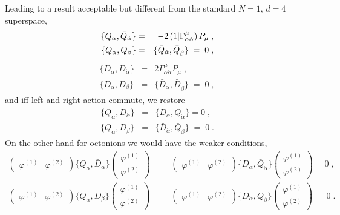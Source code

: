 \documentclass[a4paper,12pt]{book}
\begin{document}
Leading to a result acceptable but different from the standard $N=1$, $d=4$
superspace, 
\begin{eqnarray}
\{Q_{\alpha },\bar{Q}_{\dot{\alpha}}\} &=&-2\left( 1|\Gamma _{\alpha {\dot{%
\alpha}}}^{\mu }\right) P_{\mu }\;,  \nonumber \\
\{Q_{\alpha },Q_{\beta }\} &=&\{\bar{Q}_{\dot{\alpha}},\bar{Q}_{\dot{\beta}%
}\}\;=\;0\;,  \nonumber
\end{eqnarray}
\begin{eqnarray}
\{D_{\alpha },\bar{D}_{\dot{\alpha}}\} &=&2\Gamma _{\alpha {\dot{\alpha}}%
}^{\mu }P_{\mu }\;,  \nonumber \\
\{D_{\alpha },D_{\beta }\} &=&\{\bar{D}_{\dot{\alpha}},\bar{D}_{\dot{\beta}%
}\}\;=\;0\;,  \nonumber
\end{eqnarray}
and iff left and right action commute, we restore 
\begin{eqnarray}
\{Q_{\alpha },\bar{D}_{\dot{\alpha}}\} &=&\{D_{\alpha },\bar{Q}_{\dot{\alpha}%
}\}=0\;,  \nonumber \\
\{Q_{\alpha },D_{\beta }\} &=&\{\bar{D}_{\dot{\alpha}},\bar{Q}_{\dot{\beta}%
}\}\;=\;0\;.  \nonumber
\end{eqnarray}
On the other hand for octonions we would have the weaker conditions, 
\begin{eqnarray}
\left( 
\begin{array}{ll}
\varphi ^{\left( 1\right) } & \varphi ^{\left( 2\right) }
\end{array}
\right) \{Q_{\alpha },\bar{D}_{\dot{\alpha}}\}\left( 
\begin{array}{l}
\varphi ^{\left( 1\right) } \\ 
\varphi ^{\left( 2\right) }
\end{array}
\right)  &=&\left( 
\begin{array}{ll}
\varphi ^{\left( 1\right) } & \varphi ^{\left( 2\right) }
\end{array}
\right) \{D_{\alpha },\bar{Q}_{\dot{\alpha}}\}\left( 
\begin{array}{l}
\varphi ^{\left( 1\right) } \\ 
\varphi ^{\left( 2\right) }
\end{array}
\right) =0\;,  \nonumber \\
\left( 
\begin{array}{ll}
\varphi ^{\left( 1\right) } & \varphi ^{\left( 2\right) }
\end{array}
\right) \{Q_{\alpha },D_{\beta }\}\left( 
\begin{array}{l}
\varphi ^{\left( 1\right) } \\ 
\varphi ^{\left( 2\right) }
\end{array}
\right)  &=&\left( 
\begin{array}{ll}
\varphi ^{\left( 1\right) } & \varphi ^{\left( 2\right) }
\end{array}
\right) \{\bar{D}_{\dot{\alpha}},\bar{Q}_{\dot{\beta}}\}\left( 
\begin{array}{l}
\varphi ^{\left( 1\right) } \\ 
\varphi ^{\left( 2\right) }
\end{array}
\right) =\;0\;.  \nonumber
\end{eqnarray}
\end{document}

